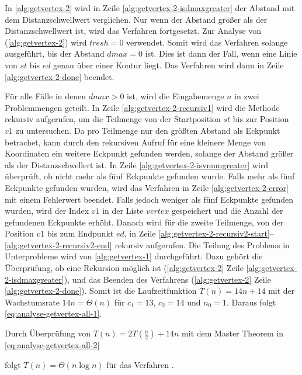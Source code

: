 In \autoref{alg:getvertex-2} wird in Zeile \ref{alg:getvertex-2-isdmaxgreater} der Abstand mit dem Distanzschwellwert
 verglichen. Nur wenn der Abstand größer als der Distanzschwellwert ist, wird das Verfahren fortgesetzt. Zur Analyse
 von  (\autoref{alg:getvertex-2}) wird $\mathit{tresh} = 0$ verwendet. Somit wird das
 Verfahren solange ausgeführt, bis der Abstand $\mathit{dmax} = 0$ ist. Dies ist dann der Fall, wenn eine Linie von
 $\mathit{st}$ bis $\mathit{ed}$ genau über einer Kontur liegt. Das Verfahren wird dann in Zeile
 \ref{alg:getvertex-2-done} beendet.

Für alle Fälle in denen $\mathit{dmax} > 0$ ist, wird die Eingabemenge $n$ in zwei Problemmengen geteilt. In Zeile
 \ref{alg:getvertex-2-recursiv1} wird die Methode  rekursiv aufgerufen, um die Teilmenge von der
 Startposition $\mathit{st}$ bis zur Position $\mathit{v1}$ zu untersuchen. Da  pro Teilmenge nur
 den größten Abstand als Eckpunkt betrachet, kann durch den rekursiven Aufruf für eine kleinere Menge von Koordinaten
 ein weitere Eckpunkt gefunden werden, solange der Abstand größer als der Distanzschwellert ist. In Zeile
 \ref{alg:getvertex-2-isvnumgreater} wird überprüft, ob nicht mehr als fünf Eckpunkte gefunden wurde. Falls mehr als
 fünf Eckpunkte gefunden wurden, wird das Verfahren in Zeile \ref{alg:getvertex-2-error} mit einem Fehlerwert beendet.
 Falls jedoch weniger als fünf Eckpunkte gefunden wurden, wird der Index $\mathit{v1}$ in der Liste $\mathit{vertex}$
 gespeichert und die Anzahl der gefundenen Eckpunkte erhöht. Danach wird  für die zweite Teilmenge,
 von der Position $\mathit{v1}$ bis zum Endpunkt $\mathit{ed}$, in Zeile
  \ref{alg:getvertex-2-recursiv2-start}--\ref{alg:getvertex-2-recursiv2-end} rekursiv aufgerufen. Die Teilung des
 Problems in Unterprobleme wird von \autoref{alg:getvertex-1} durchgeführt. Dazu gehört die Überprüfung, ob eine
 Rekursion möglich ist (\autoref{alg:getvertex-2} Zeile \ref{alg:getvertex-2-isdmaxgreater}), und das Beenden des
 Verfahrens (\autoref{alg:getvertex-2} Zeile \ref{alg:getvertex-2-done}). Somit ist die Laufzeitfunktion
 $T(n) = 14n + 14$ mit der Wachstumsrate $14n = \Theta(n)$ für $c_{1} = 13$, $c_{2} = 14$ und $n_{0} = 1$. Daraus
 folgt \autoref{eq:analyse-getvertex-all-1}.

Durch Überprüfung von $T(n) = 2T(\tfrac{n}{2}) + 14n$ mit dem Master Theorem in \autoref{eq:analyse-getvertex-all-2}

folgt $T(n) = \Theta(n \log n)$ für das Verfahren .

